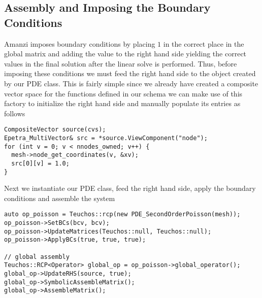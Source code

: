 \subsection{Assembly and Imposing the Boundary Conditions}\label{Sec:AssemblyAndBoundaryCond}
Amanzi imposes boundary conditions by placing $1$ in the correct place in the global matrix and adding the value to the right hand side yielding the correct values in the final solution after the linear solve is performed. Thus, before imposing these conditions we must feed the right hand side to the object created by our PDE class. This is fairly simple since we already have created a composite vector space for the functions defined in our schema we can make use of this factory to initialize the right hand side and manually populate its entries as follows
%
\begin{lstlisting}
CompositeVector source(cvs);
Epetra_MultiVector& src = *source.ViewComponent("node");
for (int v = 0; v < nnodes_owned; v++) {
  mesh->node_get_coordinates(v, &xv);
  src[0][v] = 1.0;
}
\end{lstlisting}
%
Next we instantiate our PDE class, feed the right hand side, apply the boundary conditions and assemble the system
%
\begin{lstlisting}
auto op_poisson = Teuchos::rcp(new PDE_SecondOrderPoisson(mesh));
op_poisson->SetBCs(bcv, bcv);
op_poisson->UpdateMatrices(Teuchos::null, Teuchos::null);
op_poisson->ApplyBCs(true, true, true);

// global assembly
Teuchos::RCP<Operator> global_op = op_poisson->global_operator();
global_op->UpdateRHS(source, true);
global_op->SymbolicAssembleMatrix();
global_op->AssembleMatrix();
\end{lstlisting}


